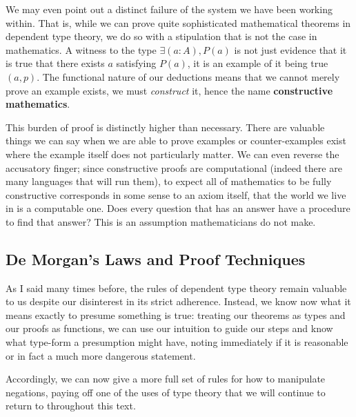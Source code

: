 \documentclass[11pt]{article}
\begin{document}
We may even point out a distinct failure of the system we have been working within. That is, while we can prove quite sophisticated mathematical theorems in dependent type theory, we do so with a stipulation that is not the case in mathematics. A witness to the type $\exists (a : A), P(a)$ is not just evidence that it is true that there exists $a$ satisfying $P(a)$, it is an example of it being true $(a,p)$. The functional nature of our deductions means that we cannot merely prove an example exists, we must \emph{construct} it, hence the name \textbf{constructive mathematics}.

This burden of proof is distinctly higher than necessary. There are valuable things we can say when we are able to prove examples or counter-examples exist where the example itself does not particularly matter. We can even reverse the accusatory finger; since constructive proofs are computational (indeed there are many languages that will run them), to expect all of mathematics to be fully constructive corresponds in some sense to an axiom itself, that the world we live in is a computable one. Does every question that has an answer have a procedure to find that answer? This is an assumption mathematicians do not make.

\subsection{De Morgan's Laws and Proof Techniques}

As I said many times before, the rules of dependent type theory remain valuable to us despite our disinterest in its strict adherence. Instead, we know now what it means exactly to presume something is true: treating our theorems as types and our proofs as functions, we can use our intuition to guide our steps and know what type-form a presumption might have, noting immediately if it is reasonable or in fact a much more dangerous statement.

Accordingly, we can now give a more full set of rules for how to manipulate negations, paying off one of the uses of type theory that we will continue to return to throughout this text.
\end{document}

